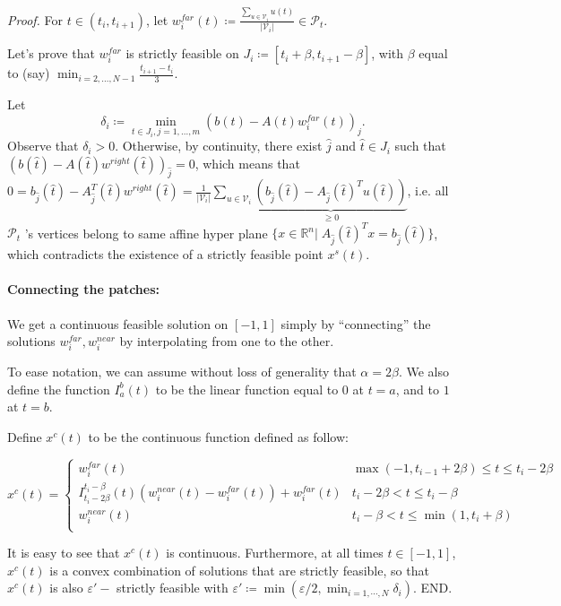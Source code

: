 \documentclass[moor]{informs1}
\renewenvironment{proof}{\emph{Proof.}}{END.}
\begin{document}
\begin{proof}
For  \(t \in (t_i, t_{i+1})\), let \(w_i^{far}(t) \coloneqq \frac{\sum_{u \in \mathcal V_i} u(t)}{|\mathcal V_i|} \in \mathcal P_t\).

\noindent Let's prove that  \(w_i^{far}\) is strictly feasible on \(J_i \coloneqq [t_i+\beta, t_{i+1}-\beta]\), with \(\beta\) equal to (say) \(\min_{i=2,\ldots, N-1} \frac{t_{i+1}-t_i}{3}\).

\noindent Let
$$\delta_i^{} \coloneqq \min_{t \in J_i, j=1,\ldots, m} (b(t) - A(t)w_i^{far}(t))_j.$$
Observe that \(\delta_i > 0\). Otherwise, by continuity, there exist \(\hat j\) and \(\hat t \in J_i\) such that \((b(\hat t) - A(\hat t)w^{right}(\hat t))_{\hat j} = 0\), which means that 
\(0 = b_{\hat j}(\hat t)- A_{\hat j}^T(\hat t)w^{right}(\hat t) = \frac1{|\mathcal V_i|} \sum_{u \in \mathcal V_i} \underbrace{(b_{\hat j}(\hat t) - A_{\hat j}(\hat t)^Tu(\hat t))}_{\ge 0}\), i.e. all \(\mathcal P_t\) 's vertices belong to same affine hyper plane \(\{x \in \mathbb R^n |\; A_{\hat j}(\hat t)^T x = b_{\hat j}(\hat t) \}\), which contradicts the existence of a strictly feasible point \(x^s(t)\).

\paragraph{Connecting the patches:}

We get a continuous feasible solution on \([-1, 1]\) simply by ``connecting'' the solutions \(w_i^{far}, w_i^{near}\) by interpolating from one to the other. 

To ease notation, we can assume without loss of generality that \(\alpha = 2 \beta\). We also define the function \(I_a^b(t)\) to be the linear function equal to \(0\) at \(t = a\), and to \(1\) at \(t = b\).


Define \(x^c(t)\) to be the continuous function defined as follow:



\[x^c(t) = \left\{\begin{array}{cc}
   w_i^{far}(t) & \max(-1, t_{i-1}+2\beta) \le t \le t_{i} - 2\beta\\
   I_{t_{i} - 2\beta}^{t_{i} - \beta}(t) (w_i^{near}(t) - w_i^{far}(t)) + w_i^{far}(t) & t_{i}-2\beta < t \le t_{i} - \beta\\
   w_i^{near}(t) & t_{i}-\beta < t \le \min(1, t_{i} + \beta)\\
   \end{array}\right.
   \]


It is easy to see that \(x^c(t)\) is continuous. Furthermore, at all times \(t \in [-1, 1]\), \(x^c(t)\) is a convex combination of solutions that are strictly feasible, so that \(x^c(t)\) is also \(\varepsilon'-\) strictly feasible with  \(\varepsilon' \coloneqq \min(\varepsilon/2, \min_{i=1,\cdots,N} \delta_i)\).
\end{proof}
\newpage
\end{document}

